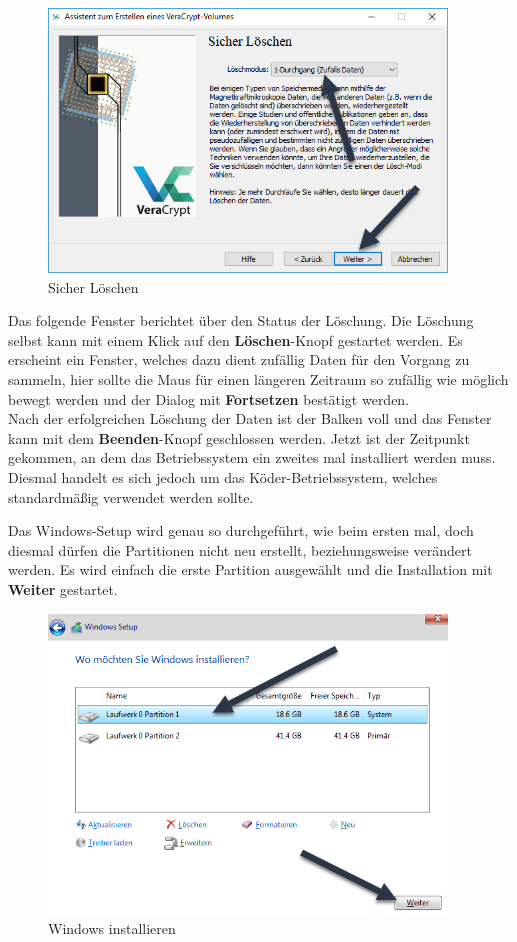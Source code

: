 \documentclass[12pt,a4paper]{scrreprt}
\begin{document}
\begin{figure}[h]
\begin{center}
\includegraphics[width=300pt]{media/hb7.png}
\caption{Sicher Löschen}
\label{hb7}
\end{center}
\end{figure}

\noindent Das folgende Fenster berichtet über den Status der Löschung. Die Löschung selbst kann mit einem Klick auf den \textbf{Löschen}-Knopf gestartet werden. Es erscheint ein Fenster, welches dazu dient zufällig Daten für den Vorgang zu sammeln, hier sollte die Maus für einen längeren Zeitraum so zufällig wie möglich bewegt werden und der Dialog mit \textbf{Fortsetzen} bestätigt werden. \\

\noindent Nach der erfolgreichen Löschung der Daten ist der Balken voll und das Fenster kann mit dem \textbf{Beenden}-Knopf geschlossen werden. Jetzt ist der Zeitpunkt gekommen, an dem das Betriebssystem ein zweites mal installiert werden muss. Diesmal handelt es sich jedoch um das Köder-Betriebssystem, welches standardmäßig verwendet werden sollte. \\

\newpage

\noindent Das Windows-Setup wird genau so durchgeführt, wie beim ersten mal, doch diesmal dürfen die Partitionen nicht neu erstellt, beziehungsweise verändert werden. Es wird einfach die erste Partition ausgewählt und die Installation mit \textbf{Weiter} gestartet.

\begin{figure}[h]
\begin{center}
\includegraphics[width=300pt]{media/hb8.png}
\caption{Windows installieren}
\label{hb8}
\end{center}
\end{figure}
\end{document}
